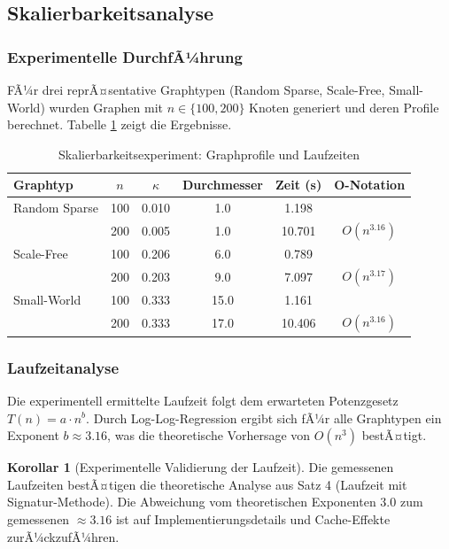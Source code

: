 ﻿\documentclass[a4paper,12pt]{article}
\theoremstyle{definition}
\newtheorem{korollar}{Korollar}
\begin{document}
	\subsection{Skalierbarkeitsanalyse}
	
	\subsubsection{Experimentelle DurchfÃ¼hrung}
	
	FÃ¼r drei reprÃ¤sentative Graphtypen (Random Sparse, Scale-Free, Small-World) wurden Graphen mit $n \in \{100, 200\}$ Knoten generiert und deren Profile berechnet. Tabelle \ref{tab:scalability} zeigt die Ergebnisse.
	
	\begin{table}[H]
		\centering
		\caption{Skalierbarkeitsexperiment: Graphprofile und Laufzeiten}
		\label{tab:scalability}
		\begin{tabular}{lccccc}
			\hline
			\textbf{Graphtyp} & $n$ & $\kappa$ & \textbf{Durchmesser} & \textbf{Zeit (s)} & \textbf{O-Notation} \\
			\hline
			Random Sparse & 100 & 0.010 & 1.0 & 1.198 & \\
			& 200 & 0.005 & 1.0 & 10.701 & $O(n^{3.16})$ \\
			\hline
			Scale-Free & 100 & 0.206 & 6.0 & 0.789 & \\
			& 200 & 0.203 & 9.0 & 7.097 & $O(n^{3.17})$ \\
			\hline
			Small-World & 100 & 0.333 & 15.0 & 1.161 & \\
			& 200 & 0.333 & 17.0 & 10.406 & $O(n^{3.16})$ \\
			\hline
		\end{tabular}
	\end{table}
	
	\subsubsection{Laufzeitanalyse}
	
	Die experimentell ermittelte Laufzeit folgt dem erwarteten Potenzgesetz $T(n) = a \cdot n^b$. Durch Log-Log-Regression ergibt sich fÃ¼r alle Graphtypen ein Exponent $b \approx 3.16$, was die theoretische Vorhersage von $O(n^3)$ bestÃ¤tigt.
	
	\begin{korollar}[Experimentelle Validierung der Laufzeit]
		Die gemessenen Laufzeiten bestÃ¤\-tigen die theoretische Analyse aus Satz 4 (Laufzeit mit Signatur-Methode). Die Abweichung vom theoretischen Exponenten $3.0$ zum gemessenen $\approx 3.16$ ist auf Implementierungsdetails und Cache-Effekte zurÃ¼ckzufÃ¼hren.
	\end{korollar}
	
\end{document}
